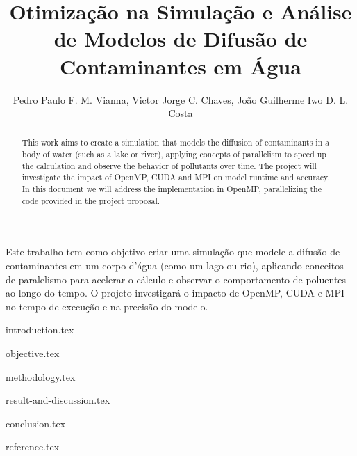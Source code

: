 \documentclass[12pt]{article}
\title{Otimização na Simulação e Análise de Modelos de Difusão de Contaminantes em Água}
\author{Pedro Paulo F. M. Vianna, Victor Jorge C. Chaves, João Guilherme Iwo D. L. Costa}
\begin{document}
\maketitle

\begin{abstract}
  This work aims to create a simulation that models the diffusion of contaminants in a body of water (such as a lake or river), applying concepts of parallelism to speed up the calculation and observe the behavior of pollutants over time. The project will investigate the impact of OpenMP, CUDA and MPI on model runtime and accuracy. In this document we will address the implementation in OpenMP, parallelizing the code provided in the project proposal.
\end{abstract}

\begin{resumo}
  Este trabalho tem como objetivo criar uma simulação que modele a difusão de contaminantes em um corpo d'água (como um lago ou rio), aplicando conceitos de paralelismo para acelerar o cálculo e observar o comportamento de poluentes ao longo do tempo. O projeto investigará o impacto de OpenMP, CUDA e MPI no tempo de execução e na precisão do modelo.
\end{resumo}

{introduction.tex}

{objective.tex}

{methodology.tex}

{result-and-discussion.tex}

{conclusion.tex}

{reference.tex}
\end{document}
